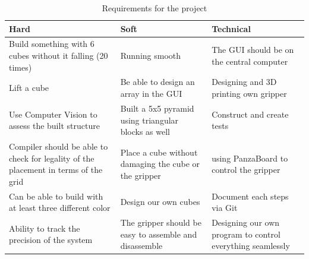 \begin{table}[H]
    \centering
    \caption{Requirements for the project}
    \label{tab:grid_table}
    \begin{tabular}{| p{4.7cm} | p{4.7cm} | p{4.7cm} |} 
        \hline
        \textbf{Hard} & \textbf{Soft} & \textbf{Technical} \\ \hline
        Build something with 6 cubes without it falling (20 times) \cellcolor{red!25} & Running smooth \cellcolor{red!25} & The GUI should be on the central computer \cellcolor{red!25} \\ \hline
        Lift a cube \cellcolor{red!25} & Be able to design an array in the GUI \cellcolor{green!25}  & Designing and 3D printing own gripper \cellcolor{red!25} \\ \hline
        Use Computer Vision to assess the built structure \cellcolor{yellow!25} & Built a 5x5 pyramid using triangular blocks as well \cellcolor{yellow!25}  & Construct and create tests \cellcolor{red!25} \\ \hline
        Compiler should be able to check for legality of the placement in terms of the grid \cellcolor{red!25}  & Place a cube without damaging the cube or the gripper \cellcolor{green!25} & using PanzaBoard to control the gripper \cellcolor{red!25} \\ \hline
        Can be able to build with at least three different color \cellcolor{green!25} & Design our own cubes \cellcolor{green!25} & Document each steps via Git \cellcolor{red!25} \\ \hline
        Ability to track the precision of the system \cellcolor{red!25} & The gripper should be easy to assemble and disassemble \cellcolor{green!25} & Designing our own program to control everything seamlessly \cellcolor{red!25} \\ \hline
    \end{tabular}
\end{table}



